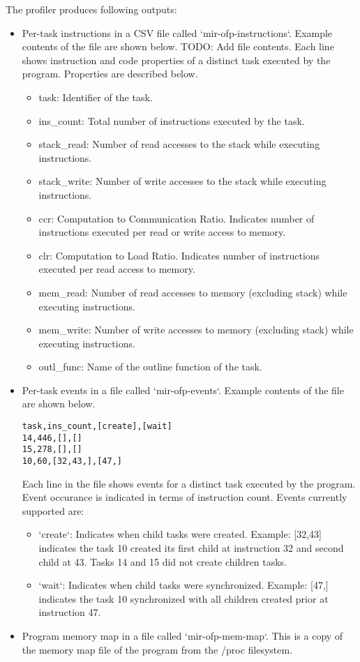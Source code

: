 \documentclass[11pt,a4paper]{article}
\begin{document}
The profiler produces following outputs: 
\begin{itemize}
    \item Per-task instructions in a CSV file called `mir-ofp-instructions`. Example contents of the file are shown below.  TODO: Add file contents.  Each line shows instruction and code properties of a distinct task executed by the program. Properties are described below.
        \begin{itemize}
            \item task: Identifier of the task.       
            \item ins\_count: Total number of instructions executed by the task. 
            \item stack\_read: Number of read accesses to the stack while executing instructions.
            \item stack\_write: Number of write accesses to the stack while executing instructions.
            \item ccr: Computation to Communication Ratio. Indicates number of instructions executed per read or write access to memory.
            \item clr: Computation to Load Ratio. Indicates number of instructions executed per read access to memory.
            \item mem\_read: Number of read accesses to memory (excluding stack) while executing instructions.
            \item mem\_write: Number of write accesses to memory (excluding stack) while executing instructions.
            \item outl\_func: Name of the outline function of the task.
        \end{itemize}
    \item Per-task events in a file called `mir-ofp-events`. Example contents of the file are shown below. 
\begin{lstlisting}[style=MyInputStyle]
task,ins_count,[create],[wait]
14,446,[],[]
15,278,[],[]
10,60,[32,43,],[47,]
\end{lstlisting}
        Each line in the file shows events for a distinct task executed by the program. Event occurance is indicated in terms of instruction count. Events currently supported are: 
        \begin{itemize}
            \item `create`: Indicates when child tasks were created. Example: [32,43] indicates the task 10 created its first child at instruction 32 and second child at 43. Tasks 14 and 15 did not create children tasks.
            \item `wait`: Indicates when child tasks were synchronized. Example: [47,] indicates the task 10 synchronized with all children created prior at instruction 47. 
        \end{itemize}
    \item Program memory map in a file called `mir-ofp-mem-map`. This is a copy of the memory map file of the program from the /proc filesystem.
\end{itemize}
\end{document}
